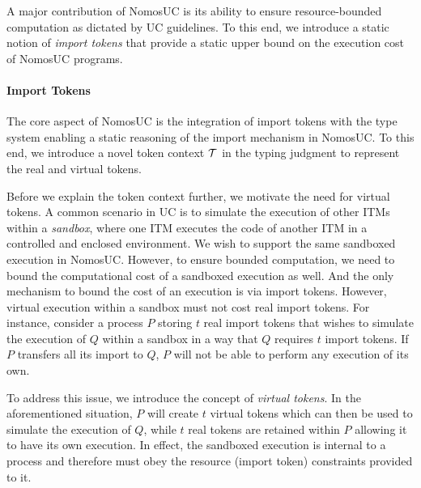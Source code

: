 A major contribution of NomosUC is its ability to ensure resource-bounded computation
as dictated by UC guidelines.
To this end, we introduce a static notion of \emph{import tokens} that provide a static upper
bound on the execution cost of NomosUC programs.

\paragraph*{\textbf{Import Tokens}}
The core aspect of NomosUC is the integration of import tokens with the type system
enabling a static reasoning of the import mechanism in NomosUC.
To this end, we introduce a novel token context $\mathcal{T}$ in the typing judgment to
represent the real and virtual tokens.

Before we explain the token context further, we motivate the need for virtual tokens.
A common scenario in UC is to simulate the execution of other ITMs within a \emph{sandbox},
where one ITM executes the code of another ITM in a controlled and enclosed environment.
We wish to support the same sandboxed execution in NomosUC.
However, to ensure bounded computation, we need to bound the computational cost of a
sandboxed execution as well.
And the only mechanism to bound the cost of an execution is via import tokens.
However, virtual execution within a sandbox must not cost real import tokens.
For instance, consider a process $P$ storing $t$ real import tokens that wishes to
simulate the execution of $Q$ within a sandbox in a way that $Q$ requires $t$
import tokens.
If $P$ transfers all its import to $Q$, $P$ will not be able to perform any execution of its own.

To address this issue, we introduce the concept of \emph{virtual tokens}.
In the aforementioned situation, $P$ will create $t$ virtual tokens
which can then be used to simulate the execution of $Q$, while $t$ real tokens are retained within $P$
allowing it to have its own execution.
In effect, the sandboxed execution is internal to a process and therefore must obey the resource (import token)
constraints provided to it.

